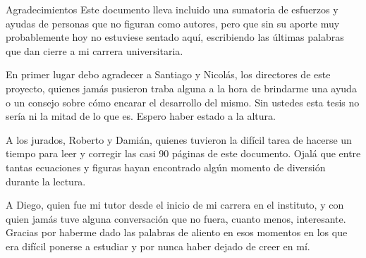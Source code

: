 \documentclass[screen,pagebackref]{ibtesis}
\begin{document}







%




\appendix


\begin{biblio}
    
\end{biblio}


\begin{postliminary}


    \begin{seccion}{Agradecimientos}
        Este documento lleva incluido una sumatoria de esfuerzos y ayudas de personas que no figuran como autores, pero que sin su aporte muy probablemente hoy no estuviese sentado aquí, escribiendo las últimas palabras que dan cierre a mi carrera universitaria.

        En primer lugar debo agradecer a Santiago y Nicolás, los directores de este proyecto, quienes jamás pusieron traba alguna a la hora de brindarme una ayuda o un consejo sobre cómo encarar el desarrollo del mismo. Sin ustedes esta tesis no sería ni la mitad de lo que es. Espero haber estado a la altura.

        A los jurados, Roberto y Damián, quienes tuvieron la difícil tarea de hacerse un tiempo para leer y corregir las casi 90 páginas de este documento. Ojalá que entre tantas ecuaciones y figuras hayan encontrado algún momento de diversión durante la lectura.

        A Diego, quien fue mi tutor desde el inicio de mi carrera en el instituto, y con quien jamás tuve alguna conversación que no fuera, cuanto menos, interesante. Gracias por haberme dado las palabras de aliento en esos momentos en los que era difícil ponerse a estudiar y por nunca haber dejado de creer en mí.


\end{seccion}
\end{postliminary}
\end{document}
